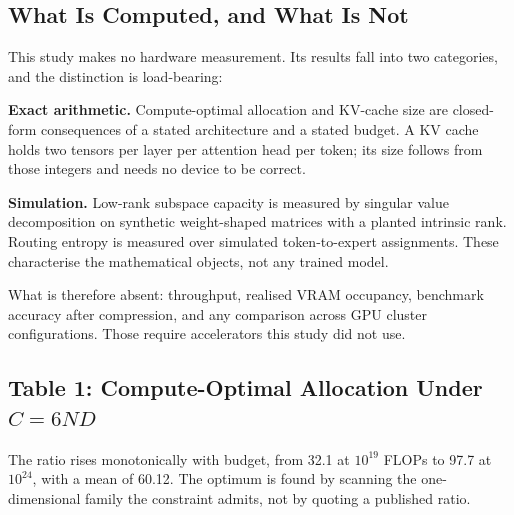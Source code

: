 \documentclass[10pt,twocolumn,letterpaper]{article}
\begin{document}
\subsection{What Is Computed, and What Is Not}


This study makes no hardware measurement. Its results fall into two categories, and the distinction is load-bearing:

\textbf{Exact arithmetic.} Compute-optimal allocation and KV-cache size are closed-form consequences of a stated architecture and a stated budget. A KV cache holds two tensors per layer per attention head per token; its size follows from those integers and needs no device to be correct.

\textbf{Simulation.} Low-rank subspace capacity is measured by singular value decomposition on synthetic weight-shaped matrices with a planted intrinsic rank. Routing entropy is measured over simulated token-to-expert assignments. These characterise the mathematical objects, not any trained model.

What is therefore absent: throughput, realised VRAM occupancy, benchmark accuracy after compression, and any comparison across GPU cluster configurations. Those require accelerators this study did not use.


\subsection{Table 1: Compute-Optimal Allocation Under $C = 6ND$}
\begin{table}[htbp]
\centering
{}
\end{table}

The ratio rises monotonically with budget, from 32.1 at $10^{19}$ FLOPs to 97.7 at $10^{24}$, with a mean of 60.12. The optimum is found by scanning the one-dimensional family the constraint admits, not by quoting a published ratio.
\end{document}
